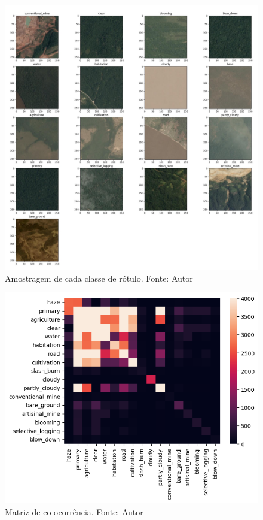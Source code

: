 \begin{figure}[!ht]
    \centering
    \includegraphics[width=\columnwidth]{Imagens/results/EDA/Class Sampling.jpg}
    \caption{Amostragem de cada classe de rótulo.
    Fonte: Autor}
   \label{fig:classes}
\end{figure}


\begin{figure}[!ht]
    \centering
    \includegraphics[width=0.5\columnwidth]{Imagens/results/EDA/matriz de coocorrencia.png}
    \caption{Matriz de co-ocorrência.
    Fonte: Autor}
   \label{fig:coocorrencia}
\end{figure}


